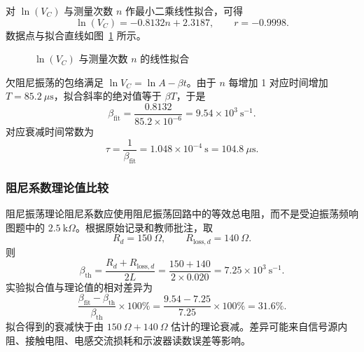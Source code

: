 ﻿\documentclass[UTF8,12pt,a4paper]{ctexart}
\numberwithin{equation}{section}
\begin{document}
对 \(\ln(V_C)\) 与测量次数 \(n\) 作最小二乘线性拟合，可得
\begin{equation}
    \ln(V_C)=-0.8132n+2.3187,\qquad r=-0.9998.
\end{equation}
数据点与拟合直线如图~\ref{fig:damping-fit} 所示。

\begin{figure}[H]
\centering
{}
\caption{\(\ln(V_C)\) 与测量次数 \(n\) 的线性拟合}
\label{fig:damping-fit}
\end{figure}

欠阻尼振荡的包络满足 \(\ln V_C=\ln A-\beta t\)。由于 \(n\) 每增加 1 对应时间增加 \(T=85.2\ \mu\mathrm{s}\)，拟合斜率的绝对值等于 \(\beta T\)，于是
\begin{equation}
    \beta_{\mathrm{fit}}
    =\frac{0.8132}{85.2\times10^{-6}}
    =9.54\times10^3\ \mathrm{s^{-1}}.
\end{equation}
对应衰减时间常数为
\begin{equation}
    \tau=\frac{1}{\beta_{\mathrm{fit}}}
    =1.048\times10^{-4}\ \mathrm{s}
    =104.8\ \mu\mathrm{s}.
\end{equation}

\subsubsection{阻尼系数理论值比较}

阻尼振荡理论阻尼系数应使用阻尼振荡回路中的等效总电阻，而不是受迫振荡频响图题中的 \(2.5\ \mathrm{k}\Omega\)。根据原始记录和教师批注，取
\[
    R_d=150\ \Omega,\qquad
    R_{\mathrm{loss},d}=140\ \Omega.
\]
则
\begin{equation}
    \beta_{\mathrm{th}}
    =\frac{R_d+R_{\mathrm{loss},d}}{2L}
    =\frac{150+140}{2\times0.020}
    =7.25\times10^3\ \mathrm{s^{-1}}.
\end{equation}
实验拟合值与理论值的相对差异为
\begin{equation}
    \frac{\beta_{\mathrm{fit}}-\beta_{\mathrm{th}}}{\beta_{\mathrm{th}}}\times100\%
    =\frac{9.54-7.25}{7.25}\times100\%
    =31.6\%.
\end{equation}
拟合得到的衰减快于由 \(150\ \Omega+140\ \Omega\) 估计的理论衰减。差异可能来自信号源内阻、接触电阻、电感交流损耗和示波器读数误差等影响。
\end{document}
